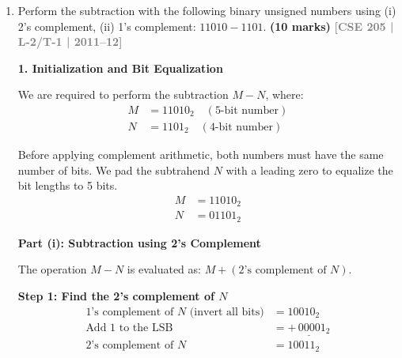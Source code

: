\documentclass[12pt,a3paper]{article}
\newcommand{\yr}[1]{\hfill\textcolor{gray}{\small\textbf{[#1]}}}
\newcommand{\mk}[1]{\textcolor{orange!70!black}{\small\textbf{(#1 marks)}}}
\begin{document}
\begin{enumerate}
\begin{tcolorbox}[enhanced,breakable,ansbox,colback=cD!4,colframe=cD,boxrule=0.8pt,arc=5pt,title={\textbf{Answer}},fonttitle=\bfseries\color{white},colbacktitle=cD]
The fractional part has reached exactly $.0000$, so the conversion terminates. Reading the integer parts from top to bottom, we obtain:
\begin{align*}
    (0.6875)_{10} &= (0.1011)_{2}
\end{align*}

\vspace{1em}
\textbf{\textcolor{cD}{3. Final Result}}

Combining the binary integer and fractional parts together:
\begin{align*}
    (41)_{10} + (0.6875)_{10} &= (101001)_{2} + (0.1011)_{2} \\
    (41.6875)_{10} &= \mathbf{(101001.1011)_{2}}
\end{align*}

\end{tcolorbox}

\item Perform the subtraction with the following binary unsigned numbers using (i) 2's complement, (ii) 1's complement: $11010 - 1101$.
\mk{10} \yr{CSE 205 | L-2/T-1 | 2011--12}

\begin{tcolorbox}[enhanced,breakable,ansbox,colback=cD!4,colframe=cD,boxrule=0.8pt,arc=5pt,title={\textbf{Answer}},fonttitle=\bfseries\color{white},colbacktitle=cD]

\textbf{\textcolor{cD}{1. Initialization and Bit Equalization}}

We are required to perform the subtraction $M - N$, where:
\begin{align*}
    M &= 11010_2 \quad (\text{5-bit number}) \\
    N &= 1101_2 \quad (\text{4-bit number})
\end{align*}

Before applying complement arithmetic, both numbers must have the same number of bits. We pad the subtrahend $N$ with a leading zero to equalize the bit lengths to 5 bits.
\begin{align*}
    M &= 11010_2 \\
    N &= 01101_2
\end{align*}

\vspace{1em}
\textbf{\textcolor{cD}{Part (i): Subtraction using 2's Complement}}

The operation $M - N$ is evaluated as: $M + (\text{2's complement of } N)$.

\textbf{Step 1: Find the 2's complement of $N$}
\begin{align*}
    \text{1's complement of } N \text{ (invert all bits)} &= 10010_2 \\
    \text{Add 1 to the LSB} &= \underline{+\,00001_2} \\
    \text{2's complement of } N &= 10011_2
\end{align*}


\end{tcolorbox}
\end{enumerate}
\end{document}
